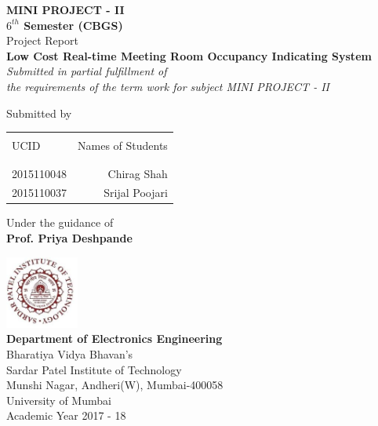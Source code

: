 \begin{titlepage}

\begin{center}

\textup{\small {\bf MINI PROJECT - II\\  $6 ^{th}$ Semester (CBGS) } \\ Project Report}\\[0.2in]

\Large \textbf {Low Cost Real-time Meeting Room Occupancy Indicating System}\\[0.5in]

       \small \emph{Submitted in partial fulfillment of\\
        the requirements of the term work for subject MINI PROJECT - II}
        \vspace{1in}

     

\normalsize Submitted by \\
\begin{table}[h]
\centering
\begin{tabular}{lr}\hline \\
UCID & Names of Students \\ \\ \hline
\\
2015110048 &  Chirag Shah \\
2015110037 &  Srijal Poojari \\ 
 \hline 
\end{tabular}
\end{table}

\vspace{.1in}
Under the guidance of\\
{\textbf{Prof. Priya Deshpande}}\\[0.2in]

\vfill

\includegraphics[width=0.18\textwidth]{spit_logo.jpg}\\[0.1in]

\textbf {Department of Electronics Engineering}\\
Bharatiya  Vidya Bhavan's\\
Sardar Patel Institute of Technology\\
Munshi Nagar, Andheri(W), Mumbai-400058\\
University of Mumbai\\
Academic Year 2017 - 18\\


\end{center}

\end{titlepage}

